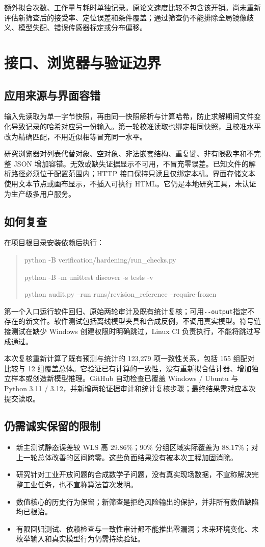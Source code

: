 \documentclass[UTF8,a4paper,zihao=-4,fontset=none]{ctexart}
\newcommand{\code}[1]{{\small\nolinkurl{#1}}}
\begin{document}
额外拟合次数、工作量与耗时单独记录。原论文速度比较不包含该开销。尚未重新评估新筛查后的接受率、定位误差和条件覆盖；通过筛查仍不能排除全局镜像歧义、模型失配、错误传感器标定或分布偏移。

\newpage
\section{接口、浏览器与验证边界}
\subsection{应用来源与界面容错}
输入先读取为单一字节快照，再由同一快照解析与计算哈希，防止求解期间文件变化导致记录的哈希对应另一份输入。第一轮校准读取也绑定相同快照，且校准水平改为精确匹配，不用近似相等冒充同一水平。

研究浏览器对列表代替对象、空对象、非法嵌套结构、重复键、非有限数字和不完整 JSON 增加容错。无效或缺失证据显示不可用，不冒充零误差。已知文件的解析路径必须位于配置范围内；HTTP 接口保持只读且仅绑定本机。界面存储文本使用文本节点或画布显示，不插入可执行 HTML。它仍是本地研究工具，未认证为生产级多用户服务。

\subsection{如何复查}
在项目根目录安装依赖后执行：
\begin{quote}\ttfamily\small
python -B verification/hardening/run\_checks.py\par
python -B -m unittest discover -s tests -v\par
python audit.py --run runs/revision\_reference --require-frozen
\end{quote}
第一个入口运行软件回归、原始两轮审计及既有统计复核；可用\code{--output}指定不存在的新文件。软件测试包括离线模型夹具和合成反例，不调用真实模型。符号链接测试在缺少 Windows 创建权限时明确跳过，Linux CI 负责执行，不能将跳过写成通过。

本次复核重新计算了既有预测与统计的 123,279 项一致性关系，包括 155 组配对比较与 12 组覆盖总体。它验证已有计算的一致性，没有重新拟合估计器、增加独立样本或创造新模型推理。GitHub 自动检查已覆盖 Windows / Ubuntu 与 Python 3.11 / 3.12，并新增两轮证据审计和统计复核步骤；最终结果需对应本次提交读取。

\subsection{仍需诚实保留的限制}
\begin{itemize}
\item 新主测试静态误差较 WLS 高 29.86\%；90\% 分组区域实际覆盖为 88.17\%；对上一轮总体改善的区间跨零。这些负面结果没有被本次工程加固消除。
\item 研究针对工业开放问题的合成数学子问题，没有真实现场数据，不宣称解决完整工业任务，也不宣称算法首次发明。
\item 数值核心的历史行为保留；新筛查是拒绝风险输出的保护，并非所有数值缺陷均已根治。
\item 有限回归测试、依赖检查与一致性审计都不能推出零漏洞；未来环境变化、未枚举输入和真实模型行为仍需持续验证。
\end{itemize}
\end{document}
